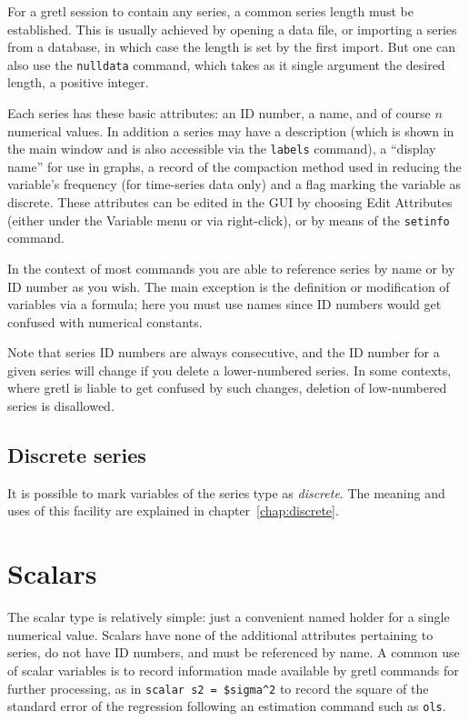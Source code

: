 For a gretl session to contain any series, a common series length must
be established. This is usually achieved by opening a data file, or
importing a series from a database, in which case the length is set by
the first import. But one can also use the \texttt{nulldata} command,
which takes as it single argument the desired length, a positive
integer.

Each series has these basic attributes: an ID number, a name, and of
course $n$ numerical values. In addition a series may have a
description (which is shown in the main window and is also accessible
via the \texttt{labels} command), a ``display name'' for use in
graphs, a record of the compaction method used in reducing the
variable's frequency (for time-series data only) and a flag marking
the variable as discrete. These attributes can be edited in the GUI by
choosing \textsf{Edit Attributes} (either under the \textsf{Variable}
menu or via right-click), or by means of the \texttt{setinfo} command.

In the context of most commands you are able to reference series by
name or by ID number as you wish. The main exception is the definition
or modification of variables via a formula; here you must use names
since ID numbers would get confused with numerical constants.

Note that series ID numbers are always consecutive, and the ID number
for a given series will change if you delete a lower-numbered series.
In some contexts, where gretl is liable to get confused by such
changes, deletion of low-numbered series is disallowed.

\subsection{Discrete series}

It is possible to mark variables of the series type as
\textit{discrete}. The meaning and uses of this facility are explained
in chapter~\ref{chap:discrete}.


\section{Scalars}
\label{sec:Scalars}

The scalar type is relatively simple: just a convenient named holder
for a single numerical value. Scalars have none of the additional
attributes pertaining to series, do not have ID numbers, and must be
referenced by name. A common use of scalar variables is to record
information made available by gretl commands for further processing,
as in \texttt{scalar s2 = \$sigma\^{}2} to record the square of the
standard error of the regression following an estimation command such
as \texttt{ols}.

